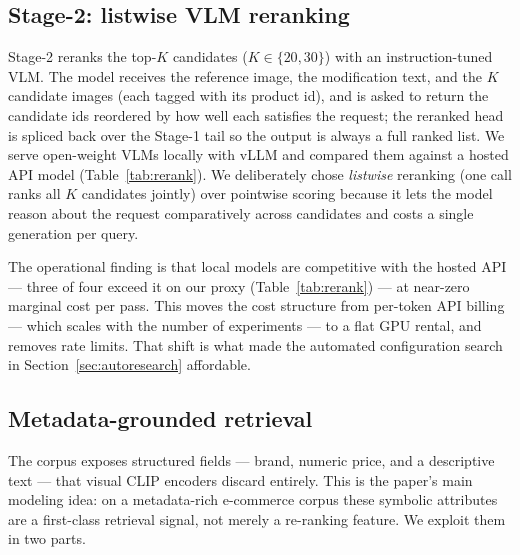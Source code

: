 \documentclass[sigconf,nonacm]{acmart}
\begin{document}
\subsection{Stage-2: listwise VLM reranking}
\label{sec:rerank}
Stage-2 reranks the top-$K$ candidates ($K\in\{20,30\}$) with an
instruction-tuned VLM. The model receives the reference image, the
modification text, and the $K$ candidate images (each tagged with its
product id), and is asked to return the candidate ids reordered by how well
each satisfies the request; the reranked head is spliced back over the
Stage-1 tail so the output is always a full ranked list. We serve
open-weight VLMs locally with vLLM and compared them against a hosted API
model (Table~\ref{tab:rerank}). We deliberately chose \emph{listwise}
reranking (one call ranks all $K$ candidates jointly) over pointwise scoring
because it lets the model reason about the request comparatively across
candidates and costs a single generation per query.

The operational finding is that local models are competitive with the hosted
API --- three of four exceed it on our proxy (Table~\ref{tab:rerank}) --- at
near-zero marginal cost per pass. This moves the cost structure from
per-token API billing --- which scales with the number of experiments --- to
a flat GPU rental, and removes rate limits. That
shift is what made the automated configuration search in
Section~\ref{sec:autoresearch} affordable.

\subsection{Metadata-grounded retrieval}
\label{sec:metadata}
The corpus exposes structured fields --- brand, numeric price, and a
descriptive text --- that visual CLIP encoders discard entirely. This is the
paper's main modeling idea: on a metadata-rich e-commerce corpus these
symbolic attributes are a first-class retrieval signal, not merely a
re-ranking feature. We exploit them in two parts.
\end{document}
